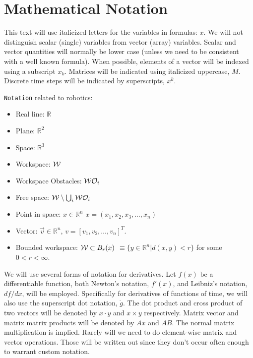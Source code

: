 \hypertarget{mathematical-notation}{%
\section{Mathematical Notation}\label{mathematical-notation}}

This text will use italicized letters for the variables in formulas:
\(x\). We will not distinguish scalar (single) variables from vector
(array) variables. Scalar and vector quantities will normally be lower
case (unless we need to be consistent with a well known formula). When
possible, elements of a vector will be indexed using a subscript
\(x_k\). Matrices will be indicated using italicized uppercase, \(M\).
Discrete time steps will be indicated by superscripts, \(x^k\).

\texttt{Notation} related to robotics:

\begin{itemize}
\tightlist
\item
  Real line: \({\mathbb R}\)
\item
  Plane: \({\mathbb R}^2\)
\item
  Space: \({\mathbb R}^3\)
\item
  Workspace: \({\cal W}\)
\item
  Workspace Obstacles: \({\cal W}{\cal O}_i\)
\item
  Free space: \({\cal W}\setminus \bigcup_i {\cal W}{\cal O}_i\)
\item
  Point in space: \(x \in {\mathbb R}^n\)
  \(x = (x_1, x_2, x_3, \dots, x_n)\)
\item
  Vector: \(\vec{v} \in {\mathbb R}^n\),
  \(v = [v_1, v_2, \dots , v_n]^T\).
\item
  Bounded workspace: \({\cal W} \subset B_r(x)\)
  \(\equiv \{ y \in {\mathbb R}^n | d(x,y) < r\}\) for some
  \(0 < r < \infty\).
\end{itemize}

We will use several forms of notation for derivatives. Let \(f(x)\) be a
differentiable function, both Newton's notation, \(f'(x)\), and
Leibniz's notation, \(df/dx\), will be employed. Specifically for
derivatives of functions of time, we will also use the superscript dot
notation, \(\dot{g}\). The dot product and cross product of two vectors
will be denoted by \(x \cdot y\) and \(x \times y\) respectively. Matrix
vector and matrix matrix products will be denoted by \(Ax\) and \(AB\).
The normal matrix multiplication is implied. Rarely will we need to do
element-wise matrix and vector operations. Those will be written out
since they don't occur often enough to warrant custom notation.

